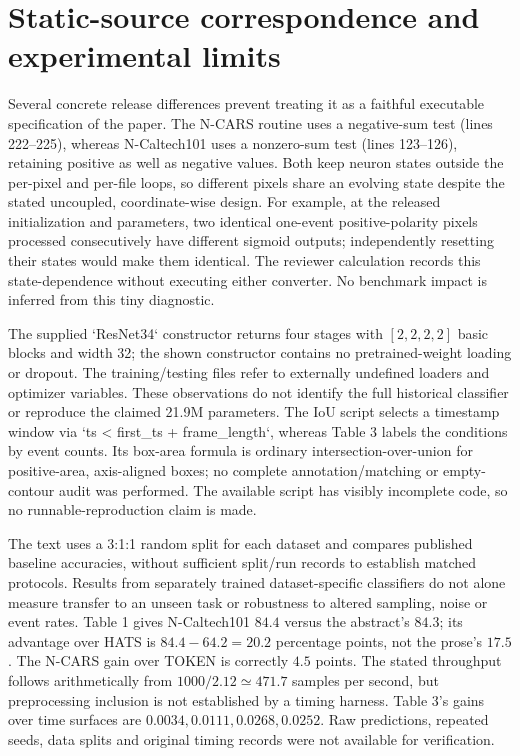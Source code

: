 \documentclass[10pt]{article}
\begin{document}
\section*{Static-source correspondence and experimental limits}
Several concrete release differences prevent treating it as a faithful executable specification of the paper. The N-CARS routine uses a negative-sum test (lines 222–225), whereas N-Caltech101 uses a nonzero-sum test (lines 123–126), retaining positive as well as negative values. Both keep neuron states outside the per-pixel and per-file loops, so different pixels share an evolving state despite the stated uncoupled, coordinate-wise design. For example, at the released initialization and parameters, two identical one-event positive-polarity pixels processed consecutively have different sigmoid outputs; independently resetting their states would make them identical. The reviewer calculation records this state-dependence without executing either converter. No benchmark impact is inferred from this tiny diagnostic.\par
The supplied `ResNet34` constructor returns four stages with \([2,2,2,2]\) basic blocks and width 32; the shown constructor contains no pretrained-weight loading or dropout. The training/testing files refer to externally undefined loaders and optimizer variables. These observations do not identify the full historical classifier or reproduce the claimed 21.9M parameters. The IoU script selects a timestamp window via `ts < first\_ts + frame\_length`, whereas Table 3 labels the conditions by event counts. Its box-area formula is ordinary intersection-over-union for positive-area, axis-aligned boxes; no complete annotation/matching or empty-contour audit was performed. The available script has visibly incomplete code, so no runnable-reproduction claim is made.\par
The text uses a 3:1:1 random split for each dataset and compares published baseline accuracies, without sufficient split/run records to establish matched protocols. Results from separately trained dataset-specific classifiers do not alone measure transfer to an unseen task or robustness to altered sampling, noise or event rates. Table 1 gives N-Caltech101 \(84.4\) versus the abstract’s \(84.3\); its advantage over HATS is \(84.4-64.2=20.2\) percentage points, not the prose’s \(17.5\). The N-CARS gain over TOKEN is correctly \(4.5\) points. The stated throughput follows arithmetically from \(1000/2.12\simeq471.7\) samples per second, but preprocessing inclusion is not established by a timing harness. Table 3’s gains over time surfaces are \(0.0034,0.0111,0.0268,0.0252\). Raw predictions, repeated seeds, data splits and original timing records were not available for verification.\par
\end{document}
